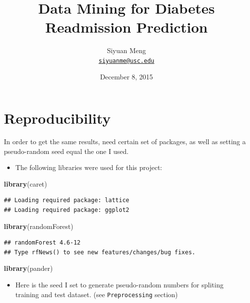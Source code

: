 \documentclass[]{article}
\title{Data Mining for Diabetes Readmission Prediction}
\author{Siyuan Meng \\ \href{mailto:siyuanme@usc.edu}{\nolinkurl{siyuanme@usc.edu}}}
\date{December 8, 2015}
\newenvironment{Shaded}{\begin{snugshade}}{\end{snugshade}}
\newcommand{\KeywordTok}[1]{\textcolor[rgb]{0.13,0.29,0.53}{\textbf{{#1}}}}
\newcommand{\NormalTok}[1]{{#1}}
\begin{document}
\maketitle


\section{Reproducibility}\label{reproducibility}

In order to get the same results, need certain set of packages, as well
as setting a pseudo-random seed equal the one I used.

\begin{itemize}
\itemsep1pt\parskip0pt
\item
  The following libraries were used for this project:
\end{itemize}

\begin{Shaded}
\begin{Highlighting}[]
\KeywordTok{library}\NormalTok{(caret)}
\end{Highlighting}
\end{Shaded}

\begin{verbatim}
## Loading required package: lattice
## Loading required package: ggplot2
\end{verbatim}

\begin{Shaded}
\begin{Highlighting}[]
\KeywordTok{library}\NormalTok{(randomForest)}
\end{Highlighting}
\end{Shaded}

\begin{verbatim}
## randomForest 4.6-12
## Type rfNews() to see new features/changes/bug fixes.
\end{verbatim}

\begin{Shaded}
\begin{Highlighting}[]
\KeywordTok{library}\NormalTok{(pander)}
\end{Highlighting}
\end{Shaded}

\begin{itemize}
\itemsep1pt\parskip0pt
\item
  Here is the seed I set to generate pseudo-random numbers for spliting
  training and test dataset. (see \texttt{Preprocessing} section)
\end{itemize}
\end{document}
